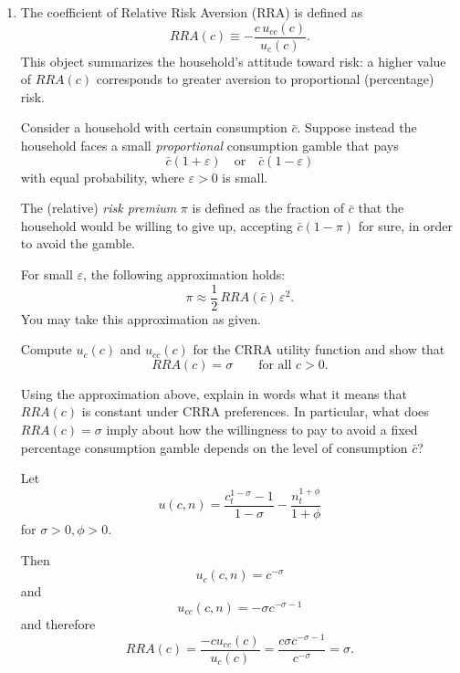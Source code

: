 \documentclass[dvipsnames,11pt]{article}
\begin{document}
        \begin{enumerate}
            \item The coefficient of Relative Risk Aversion (RRA) is defined as
            \[
            RRA(c)\equiv -\frac{c\,u_{cc}(c)}{u_c(c)}.
            \]
            This object summarizes the household's attitude toward risk: a higher value of $RRA(c)$ corresponds to greater aversion to proportional (percentage) risk.
            
            \medskip
            
            Consider a household with certain consumption $\bar c$. Suppose instead the household faces a small \emph{proportional} consumption gamble that pays
            \[
            \bar c(1+\varepsilon)
            \quad \text{or} \quad
            \bar c(1-\varepsilon)
            \]
            with equal probability, where $\varepsilon>0$ is small.
            
            The (relative) \emph{risk premium} $\pi$ is defined as the fraction of $\bar c$ that the household would be willing to give up, accepting $\bar c(1-\pi)$ for sure, in order to avoid the gamble.
            
            For small $\varepsilon$, the following approximation holds:
            \[
            \pi \approx \frac{1}{2}\,RRA(\bar c)\,\varepsilon^2.
            \]
            You may take this approximation as given.
            
            \medskip
            
            Compute $u_c(c)$ and $u_{cc}(c)$ for the CRRA utility function and show that
            \[
            RRA(c)=\sigma
            \qquad \text{for all } c>0.
            \]
            
            Using the approximation above, explain in words what it means that $RRA(c)$ is constant under CRRA preferences. In particular, what does $RRA(c)=\sigma$ imply about how the willingness to pay to avoid a fixed percentage consumption gamble depends on the level of consumption $\bar c$?

            \begin{solution}

            Let 
\begin{equation*}
    u(c,n) = \frac{c_t^{1-\sigma}-1}{1-\sigma}-\frac{n_t^{1+\phi}}{1+\phi}
\end{equation*}
for $\sigma>0,\phi>0$.

Then 
\begin{equation*}
    u_c(c,n) = c^{-\sigma}
\end{equation*}
and 
\begin{equation*}
    u_{cc}(c,n) = -\sigma c^{-\sigma-1}
\end{equation*}
and therefore
\begin{equation*}
    RRA(c)=\frac{-cu_{cc}(c)}{u_c(c)}=\frac{c \sigma c^{-\sigma-1}}{c^{-\sigma}}=\sigma.
\end{equation*}


\end{solution}
\end{enumerate}
\end{document}
